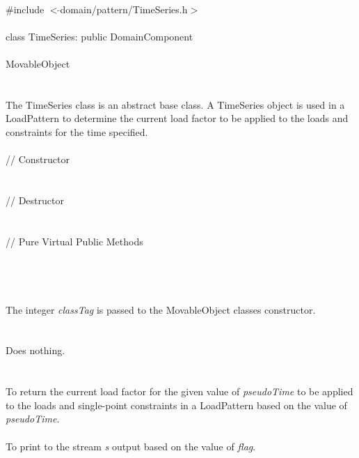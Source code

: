 
   \\
\indent \#include $<\tilde{ }$domain/pattern/TimeSeries.h$>$  \\

  \\
\indent class TimeSeries: public DomainComponent  \\

 \\
\indent MovableObject \\
\indent{} \\

 \\ 
\indent The TimeSeries class is an abstract base class. A
TimeSeries object is used in a LoadPattern to determine the current
load factor to be applied to the loads and constraints for the time
specified. \\ 

 \\
\indent // Constructor \\ 
\\ \\
\indent // Destructor \\ 
\\  \\
\indent // Pure Virtual Public Methods \\ 
\\
\\

 \\ 
\\ 
The integer {\em classTag} is passed to the MovableObject classes
constructor. \\

 \\
\\ 
Does nothing. \\

 \\
\\
To return the current load factor for the given value of {\em
pseudoTime} to be applied to the loads and single-point constraints in
a LoadPattern based on the value of {\em pseudoTime}. \\

\\
To print to the stream {\em s} output based on the value of {\em flag}.